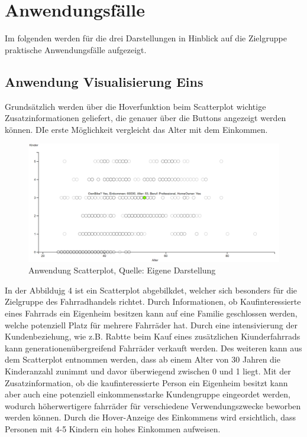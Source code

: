 \documentclass[usegeometry=true]{scrartcl}
\begin{document}
\section{Anwendungsfälle}
Im folgenden werden für die drei Darstellungen in Hinblick auf die Zielgruppe praktische Anwendungsfälle aufgezeigt. 
\subsection{Anwendung Visualisierung Eins}

Grundsätzlich werden über die Hoverfunktion beim Scatterplot wichtige Zusatzinformationen geliefert, die genauer über die Buttons angezeigt werden können. DIe erste Möglichkeit vergleicht das Alter mit dem Einkommen. 

\begin{figure}[h]
\begin{center}
\includegraphics[width=16cm]{Bilder/ScatterplotA1.png}
\caption{Anwendung Scatterplot, Quelle: Eigene Darstellung}
\end{center}
\end{figure}
In der Abbildujg 4 ist ein Scatterplot abgebilkdet, welcher sich besonders für die Zielgruppe des Fahrradhandels richtet. Durch Informationen, ob Kaufinteressierte eines Fahrrads ein Eigenheim besitzen kann auf eine Familie geschlossen werden, welche potenziell Platz für mehrere Fahrräder hat. Durch eine intensivierung der Kundenbeziehung, wie z.B. Rabtte beim Kauf eines zusätzlichen Kiunderfahrrads kann generationenübergreifend Fahrräder verkauft werden. Des weiteren kann aus dem Scatterplot entnommen werden, dass ab einem Alter von 30 Jahren die Kinderanzahl zunimmt und davor überwiegend zwischen 0 und 1 liegt. Mit der Zusatzinformation, ob die kaufinteressierte Person ein Eigenheim besitzt kann aber auch eine potenziell einkommensstarke Kundengruppe eingeordet werden, wodurch höherwertigere fahrräder für verschiedene Verwendungszwecke beworben werden können. Durch die Hover-Anzeige des Einkommens wird ersichtlich, dass Personen mit 4-5 Kindern ein hohes Einkommen aufweisen. 
\newpage
\end{document}

